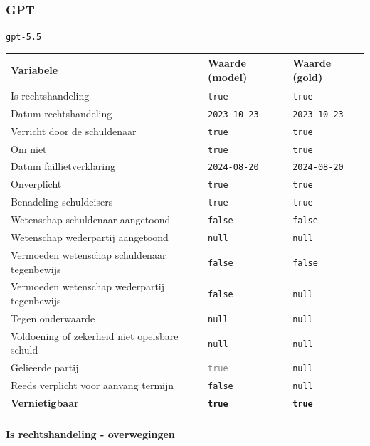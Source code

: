 \documentclass[
  dutch,
  a4paper,
]{article}
\begin{document}
\subsubsection{GPT}\label{gpt-10}

\texttt{gpt-5.5}

\begin{center}
\small
\begin{tabular}{@{}p{7.4cm}p{2.6cm}p{2.6cm}@{}}
\toprule
Variabele & Waarde (model) & Waarde (gold) \\
\midrule
Is rechtshandeling & \texttt{true} & \texttt{true} \\
Datum rechtshandeling & \texttt{2023-10-23} & \texttt{2023-10-23} \\
Verricht door de schuldenaar & \texttt{true} & \texttt{true} \\
Om niet & \texttt{true} & \texttt{true} \\
Datum faillietverklaring & \texttt{2024-08-20} & \texttt{2024-08-20} \\
Onverplicht & \texttt{true} & \texttt{true} \\
Benadeling schuldeisers & \texttt{true} & \texttt{true} \\
Wetenschap schuldenaar aangetoond & \texttt{false} & \texttt{false} \\
Wetenschap wederpartij aangetoond & \texttt{null} & \texttt{null} \\
Vermoeden wetenschap schuldenaar tegenbewijs & \texttt{false} & \texttt{false} \\
Vermoeden wetenschap wederpartij tegenbewijs & \texttt{false} & \texttt{null} \\
Tegen onderwaarde & \texttt{null} & \texttt{null} \\
Voldoening of zekerheid niet opeisbare schuld & \texttt{null} & \texttt{null} \\
Gelieerde partij & \textcolor{gray}{\texttt{true}} & \texttt{null} \\
Reeds verplicht voor aanvang termijn & \texttt{false} & \texttt{null} \\
\textbf{Vernietigbaar} & \textbf{\texttt{true}} & \textbf{\texttt{true}} \\
\bottomrule
\end{tabular}
\end{center}

\paragraph{Is rechtshandeling - overwegingen}\label{is-rechtshandeling---overwegingen-31}
\end{document}
